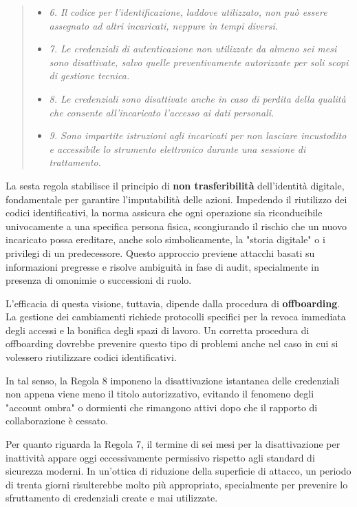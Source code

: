 \begin{quote}
    \begin{itemize}
        \item \textit{6. Il codice per l'identificazione, laddove utilizzato, non può essere assegnato ad altri incaricati, neppure in tempi diversi.}
        \item \textit{7. Le credenziali di autenticazione non utilizzate da almeno sei mesi sono disattivate, salvo quelle preventivamente autorizzate per soli scopi di gestione tecnica.}
        \item \textit{8. Le credenziali sono disattivate anche in caso di perdita della qualità che consente all'incaricato l'accesso ai dati personali.}
        \item \textit{9. Sono impartite istruzioni agli incaricati per non lasciare incustodito e accessibile lo strumento elettronico durante una sessione di trattamento.}
    \end{itemize}
\end{quote}
La sesta regola stabilisce il principio di \textbf{non trasferibilità} dell'identità digitale, fondamentale per garantire l'imputabilità delle azioni. Impedendo il riutilizzo dei codici identificativi, la norma assicura che ogni operazione sia riconducibile univocamente a una specifica persona fisica, scongiurando il rischio che un nuovo incaricato possa ereditare, anche solo simbolicamente, la "storia digitale" o i privilegi di un predecessore. Questo approccio previene attacchi basati su informazioni pregresse e risolve ambiguità in fase di audit, specialmente in presenza di omonimie o successioni di ruolo.

L'efficacia di questa visione, tuttavia, dipende dalla procedura di \textbf{offboarding}. La gestione dei cambiamenti richiede protocolli specifici per la revoca immediata degli accessi e la bonifica degli spazi di lavoro. Un corretta procedura di offboarding dovrebbe prevenire questo tipo di problemi anche nel caso in cui si volessero riutilizzare codici identificativi. 

In tal senso, la Regola 8 imponeno la disattivazione istantanea delle credenziali non appena viene meno il titolo autorizzativo, evitando il fenomeno degli "account ombra" o dormienti che rimangono attivi dopo che il rapporto di collaborazione è cessato. 

Per quanto riguarda la Regola 7, il termine di sei mesi per la disattivazione per inattività appare oggi eccessivamente permissivo rispetto agli standard di sicurezza moderni. In un'ottica di riduzione della superficie di attacco, un periodo di trenta giorni risulterebbe molto più appropriato, specialmente per prevenire lo sfruttamento di credenziali create e mai utilizzate. 

